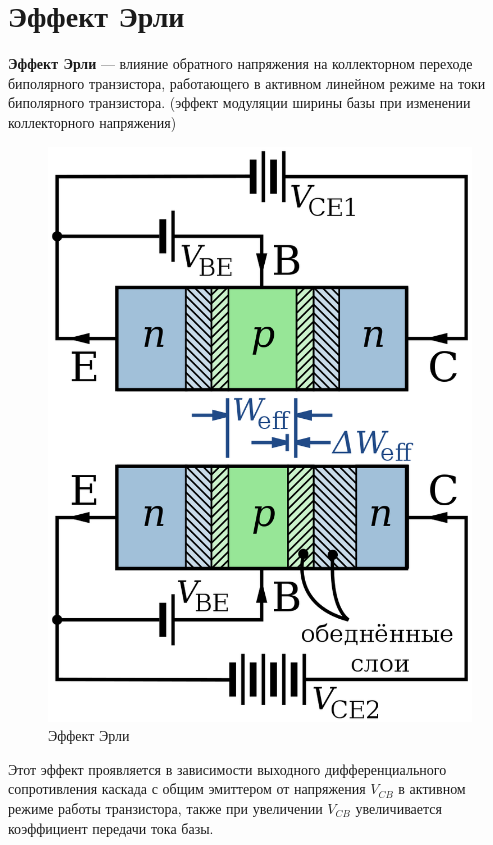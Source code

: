 \documentclass[a4paper]{article}
\begin{document}
\section{Эффект Эрли}

\textbf{Эффект Эрли} — влияние обратного напряжения на коллекторном переходе биполярного транзистора, работающего в активном линейном режиме на токи биполярного транзистора.  (эффект модуляции ширины базы при изменении коллекторного напряжения) \par 

\begin{figure}[H]
    \begin{center}
        \includegraphics[scale = 0.2]{erli.png}
    \end{center}
    \caption{Эффект Эрли}
    \label{p1}
\end{figure}

Этот эффект проявляется в зависимости выходного дифференциального сопротивления каскада с общим эмиттером от напряжения 
$V_{CB}$ в активном режиме работы транзистора, также при увеличении 
$V_{CB}$ увеличивается коэффициент передачи тока базы.
\end{document}
